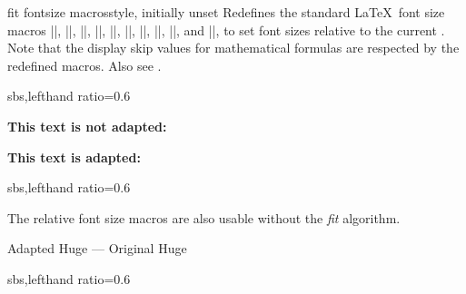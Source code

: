 \clearpage
\begin{docTcbKey}{fit fontsize macros}{}{style, initially unset}
  Redefines the standard \LaTeX\ font size macros
  |\tiny|, |\scriptsize|, |\footnotesize|, |\small|, |\normalsize|,
  |\large|, |\Large|, |\LARGE|, |\huge|, and |\Huge|,
  to set font sizes relative to
  the current . Note that the display skip values for
  mathematical formulas are respected by the redefined macros.
  Also see .

\begin{dispExample*}{sbs,lefthand ratio=0.6}

\begin{tcolorbox}[fit to height=4cm]
  {\Large\bfseries This text is
             not adapted:\par}
  \lipsum[2]
\end{tcolorbox}

\begin{tcolorbox}[fit to height=4cm,
  fit fontsize macros ]
  {\Large\bfseries This text is adapted:\par}
  \lipsum[2]
\end{tcolorbox}
\end{dispExample*}

\begin{dispExample*}{sbs,lefthand ratio=0.6}

\let\realHuge=\Huge

\begin{tcolorbox}[fit basedim=7pt,
  fontupper=\normalsize,
  fit fontsize macros]
The relative font size macros
are also usable without the
\textit{fit} algorithm.\par
{\Huge Adapted Huge} ---
{\realHuge Original Huge}
\end{tcolorbox}

\end{dispExample*}


\begin{dispExample*}{sbs,lefthand ratio=0.6}

\tcboxfit[height=5cm,
  fit fontsize macros,
  fonttitle=\normalsize\bfseries,
  title=Adapted title]
{\lipsum[2]}

\end{dispExample*}
\end{docTcbKey}


